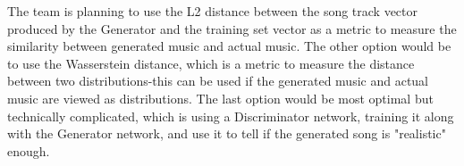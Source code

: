 \begin{par}
      \par The team is planning to use the L2 distance between the song track vector produced by the Generator and the training set vector as a metric to measure the similarity between generated music and actual music. The other option would be to use the Wasserstein distance, which is a metric to measure the distance between two distributions-this can be used if the generated music and actual music are viewed as distributions. The last option would be most optimal but technically complicated, which is using a Discriminator network, training it along with the Generator network, and use it to tell if the generated song is "realistic" enough.  
  
\end{par}